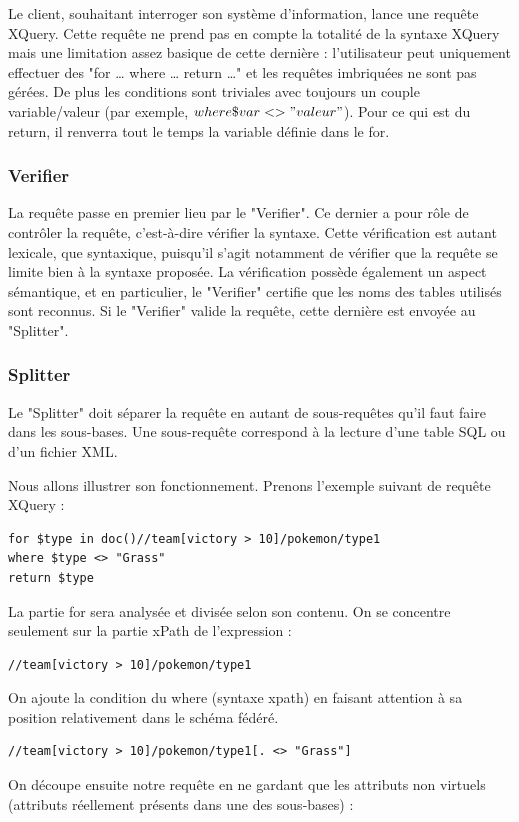 Le client, souhaitant interroger son système d'information, lance une requête XQuery. Cette requête ne prend pas en compte la totalité de la syntaxe XQuery mais une limitation assez basique de cette dernière : l'utilisateur peut uniquement effectuer des "for … where … return …" et les requêtes imbriquées ne sont pas gérées. De plus les conditions sont triviales avec toujours un couple variable/valeur (par exemple, $where \$var <> "valeur"$). Pour ce qui est du return, il renverra tout le temps la variable définie dans le for.

\subsubsection{Verifier}

La requête passe en premier lieu par le "Verifier". Ce dernier a pour rôle de contrôler la requête, c'est-à-dire vérifier la syntaxe. Cette vérification est autant lexicale, que syntaxique, puisqu'il s'agit notamment de vérifier que la requête se limite bien à la syntaxe proposée. La vérification possède également un aspect sémantique, et en particulier, le "Verifier" certifie que les noms des tables utilisés sont reconnus. Si le "Verifier" valide la requête, cette dernière est envoyée au "Splitter".

\subsubsection{Splitter}

Le "Splitter" doit séparer la requête en autant de sous-requêtes qu'il faut faire dans les sous-bases. Une sous-requête correspond à la lecture d'une table SQL ou d'un fichier XML. 

Nous allons illustrer son fonctionnement. Prenons l'exemple suivant de requête XQuery :

\begin{lstlisting}
for $type in doc()//team[victory > 10]/pokemon/type1
where $type <> "Grass"
return $type
\end{lstlisting}

La partie for sera analysée et divisée selon son contenu. On se concentre seulement sur la partie xPath de l'expression :
\begin{lstlisting}
//team[victory > 10]/pokemon/type1
\end{lstlisting}
On ajoute la condition du where (syntaxe xpath) en faisant attention à sa position relativement dans le schéma fédéré.
\begin{lstlisting}
//team[victory > 10]/pokemon/type1[. <> "Grass"]
\end{lstlisting}
On découpe ensuite notre requête en ne gardant que les attributs non virtuels (attributs réellement présents dans une des sous-bases) :

